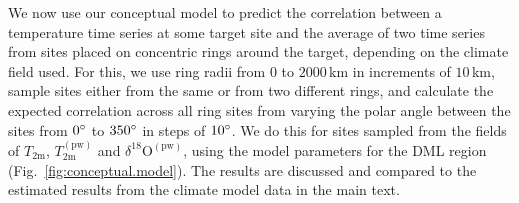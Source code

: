 \documentclass[cp, manuscript]{copernicus}
\begin{document}
We now use our conceptual model to predict the correlation between a temperature
time series at some target site and the average of two time series from sites
placed on concentric rings around the target, depending on the climate field
used. For this, we use ring radii from $0$ to $2000$\,km in increments of
$10$\,km, sample sites either from the same or from two different rings, and
calculate the expected correlation across all ring sites from varying the polar
angle between the sites from $0^{\circ}$ to $350^{\circ}$ in steps of
$10^{\circ}$. We do this for sites sampled from the fields of $T_{\mathrm{2m}}$,
$T_{\mathrm{2m}}^{\mathrm{(pw)}}$ and $\delta^{18}\mathrm{O}^{\mathrm{(pw)}}$,
using the model parameters for the DML region (Fig.~\ref{fig:conceptual.model}).
The results are discussed and compared to the estimated results from the climate
model data in the main text.

\noappendix





\end{document}
